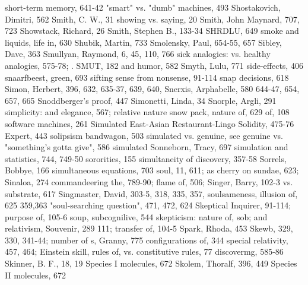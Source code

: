 short-term memory, 641-42                          "smart" vs. "dumb" machines, 493
Shostakovich, Dimitri, 562                         Smith, C. W., 31
showing vs. saying, 20                             Smith, John Maynard, 707, 723
Showstack, Richard, 26                             Smith, Stephen B., 133-34
SHRDLU, 649                                        smoke and liquids, life in, 630
Shubik, Martin, 733                                Smolensky, Paul, 654-55, 657
Sibley, Dave, 363                                  Smullyan, Raymond, 6, 45, 110, 766
sick analogies: vs. healthy analogies, 575-78; .   SMUT, 182
 and humor, 582                                    Smyth, Lulu, 771
side-effects, 406                                  snaarfbeest, green, 693
sifting sense from nonsense, 91-114                snap decisions, 618
Simon, Herbert, 396, 632, 635-37, 639, 640,        Snerxis, Arphabelle, 580
 644-47, 654, 657, 665                             Snoddberger's proof, 447
Simonetti, Linda, 34                               Snorple, Argli, 291
simplicity: and elegance, 567; relative nature     snow pack, nature of, 629
 of, 108                                           software machines, 261
Simulated East-Asian Restaurant-Lingo              Solidity, 475-76
 Expert, 443                                       solipsism bandwagon, 503
simulated vs. genuine, see genuine vs.             "something's gotta give", 586
 simulated                                         Sonneborn, Tracy, 697
simulation and statistics, 744, 749-50             sororities, 155
simultaneity of discovery, 357-58                  Sorrels, Bobbye, 166
 simultaneous equations, 703                       soul, 11, 611; as cherry on sundae, 623;
Sinaloa, 274                                        commandeering the, 789-90; flame of, 506;
Singer, Barry, 102-3                                vs. substrate, 617
Singmaster, David, 303-5, 318, 335, 357,           soulsameness, illusion of, 625
 359,363                                           "soul-searching question", 471, 472, 624
Skeptical Inquirer, 91-114; purpose of, 105-6      soup, subcognilive, 544
skepticism: nature of, sob; and relativism,        Souvenir, 289
 111; transfer of, 104-5                           Spark, Rhoda, 453
Skewb, 329, 330, 341-44; number of                 s, Granny, 775
 configurations of, 344                            special relativity, 457, 464; Einstein
skill, rules of, vs. constitutive rules, 77         discovermg, 585-86
Skinner, B. F., 18, 19                             Species I molecules, 672
Skolem, Thoralf, 396, 449                          Species II molecules, 672
